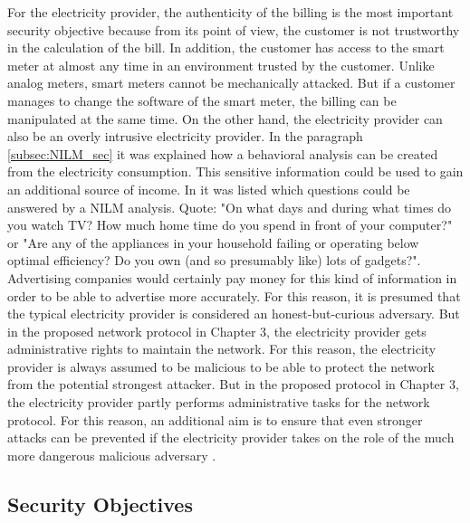 For the electricity provider, the authenticity of the billing is the most important security objective because from its point of view, the customer is not trustworthy in the calculation of the bill. In addition, the customer has access to the smart meter at almost any time in an environment trusted by the customer. Unlike analog meters, smart meters cannot be mechanically attacked. But if a customer manages to change the software of the smart meter, the billing can be manipulated at the same time. On the other hand, the electricity provider can also be an overly intrusive electricity provider. In the paragraph \ref{subsec:NILM_sec} it was explained how a behavioral analysis can be created from the electricity consumption. This sensitive information could be used to gain an additional source of income. In \cite{quinn2009privacy} it was listed which questions could be answered by a \gls{NILM} analysis. Quote: "On what days and during what times do you watch TV? How much home time do you spend in front of your computer?" or "Are any of the appliances in your household failing or operating below optimal efficiency? Do you own (and so presumably like) lots of gadgets?". Advertising companies would certainly pay money for this kind of information in order to be able to advertise more accurately. For this reason, it is presumed that the typical electricity provider is considered an honest-but-curious adversary. But in the proposed network protocol in Chapter 3, the electricity provider gets administrative rights to maintain the network. For this reason, the electricity provider is always assumed to be malicious to be able to protect the network from the potential strongest attacker. But in the proposed protocol in Chapter 3, the electricity provider partly performs administrative tasks for the network protocol. For this reason, an additional aim is to ensure that even stronger attacks can be prevented if the electricity provider takes on the role of the much more dangerous malicious adversary \cite{lemay2007unified}.

\subsection{Security Objectives}

